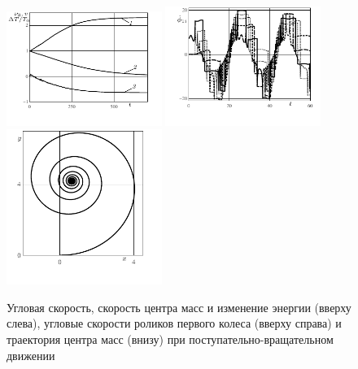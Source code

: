 \begin{figure}[H]
  \begin{center}
  \includegraphics[width=0.45\textwidth]{pic/figure7_1.pdf}
  \includegraphics[width=0.45\textwidth]{pic/figure7_2.pdf}
  \includegraphics[width=0.45\textwidth]{pic/figure7_3.pdf}
  \end{center}
  \caption{Угловая скорость, скорость центра масс и изменение энергии (вверху слева), угловые скорости роликов первого колеса (вверху справа) и траектория центра масс (внизу) при поступательно-вращательном движении}\label{fig:wrench}
\end{figure}


%

%

%